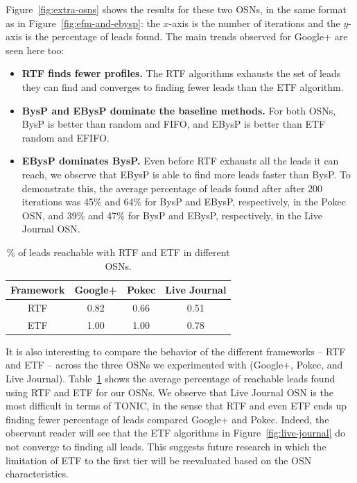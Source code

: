 \documentclass[prodmode,acmtecs]{acmsmall} %
\begin{document}
Figure~\ref{fig:extra-osns} shows the results for these two OSNs, in the same format as in Figure~\ref{fig:efm-and-ebysp}: the $x$-axis is the number of iterations and the $y$-axis is the percentage of leads found. The main trends observed for Google+ are seen here too:
\begin{itemize}
\item {\bf RTF finds fewer profiles.} The RTF algorithms exhausts the set of leads they can find and converges to finding fewer leads than the ETF algorithm.
\item {\bf BysP and EBysP dominate the baseline methods.} For both OSNs, BysP is better than random and FIFO, and EBysP is better than ETF random and EFIFO. 
\item {\bf EBysP dominates BysP.} Even before RTF exhausts all the leads it can reach, we observe that EBysP is able to find more leads faster than BysP. To demonstrate this, the average percentage of leads found after after 200 iterations was 45\% and 64\% for BysP and EBysP, respectively, in the Pokec OSN, and 39\% and 47\% for BysP and EBysP, respectively, in the Live Journal OSN. 
\end{itemize}




\begin{table}
\centering
\begin{tabular}{c|c|c|c}
Framework & Google+ & Pokec & Live Journal \\ \hline
RTF & 0.82 & 0.66 & 0.51 \\ 
ETF & 1.00 & 1.00 & 0.78 \\
\end{tabular}
\caption{\% of leads reachable with RTF and ETF in different OSNs.}
\label{tab:tiers-other-osns}
\end{table}

It is also interesting to compare the behavior of the different frameworks -- RTF and ETF -- across the three OSNs we experimented with (Google+, Pokec, and Live Journal). Table~\ref{tab:tiers-other-osns} shows the average percentage of reachable leads found using RTF and ETF for our OSNs. We observe that Live Journal OSN is the most difficult in terms of TONIC, in the sense that RTF and even ETF ends up finding fewer percentage of leads compared Google+ and Pokec. Indeed, the observant reader will see that the ETF algorithms in Figure~\ref{fig:live-journal} do not converge to finding all leads. This suggests future research in which the limitation of ETF to the first tier will be reevaluated based on the OSN characteristics. 
\end{document}
